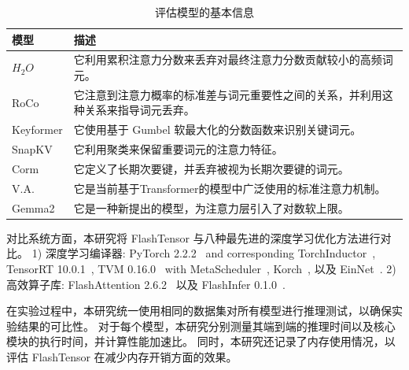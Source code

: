 \begin{table}[ht]
    \centering
    \caption{评估模型的基本信息}
    \begin{tabular}{lp{12cm}}
       \toprule
       模型   & 描述 \\
       \hline
       \(H_{2}O\)   & 它利用累积注意力分数来丢弃对最终注意力分数贡献较小的高频词元。 \\
       RoCo   & 它注意到注意力概率的标准差与词元重要性之间的关系，并利用这种关系来指导词元丢弃。 \\
       Keyformer  & 它使用基于 Gumbel 软最大化的分数函数来识别关键词元。 \\
       SnapKV   & 它利用聚类来保留重要词元的注意力特征。 \\
       Corm   & 它定义了长期次要键，并丢弃被视为长期次要键的词元。 \\
       V.A.   & 它是当前基于Transformer的模型中广泛使用的标准注意力机制。 \\
       Gemma2   & 它是一种新提出的模型，为注意力层引入了对数软上限。 \\
       \bottomrule
    \end{tabular}
    \label{tab:model_description}
\end{table}

对比系统方面，本研究将 FlashTensor 与八种最先进的深度学习优化方法进行对比。
1) {深度学习编译器}: PyTorch 2.2.2~\cite{pytorch19} and corresponding TorchInductor~\cite{torchcompile}, TensorRT 10.0.1~\cite{tensorrt},  TVM 0.16.0~\cite{chen2018tvm} with MetaScheduler~\cite{chen2018autotvm, zheng2020ansor}, Korch~\cite{hu2024korch}, 以及 EinNet~\cite{zheng2023einnet}. 
2) {高效算子库}: FlashAttention 2.6.2~\cite{dao2022flashattention, dao2023flashattention} 以及 FlashInfer 0.1.0~\cite{ye2025flashinfer}.

在实验过程中，本研究统一使用相同的数据集对所有模型进行推理测试，以确保实验结果的可比性。
对于每个模型，本研究分别测量其端到端的推理时间以及核心模块的执行时间，并计算性能加速比。
同时，本研究还记录了内存使用情况，以评估 FlashTensor 在减少内存开销方面的效果。

